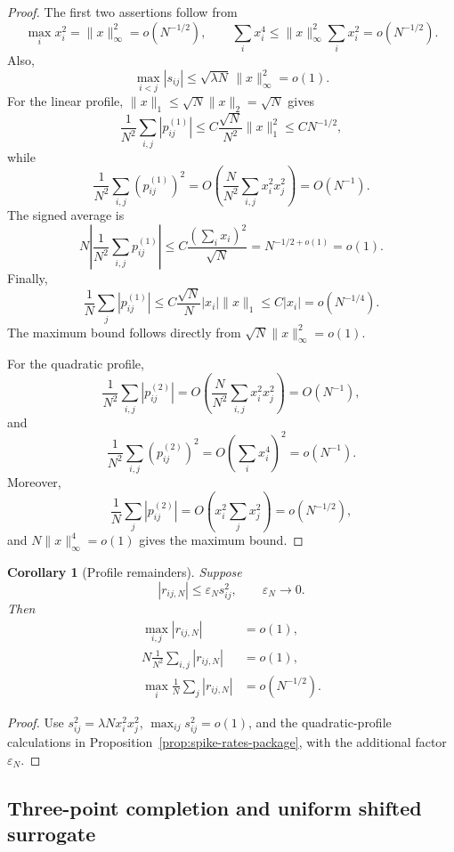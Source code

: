 \documentclass[11pt]{article}
\newtheorem{corollary}[theorem]{Corollary}
\theoremstyle{definition}
\theoremstyle{remark}
\newcommand{\norm}[1]{\lVert #1\rVert}
\begin{document}
\begin{proof}
The first two assertions follow from
\[
 \max_i x_i^2=\norm{x}_\infty^2=o(N^{-1/2}),
 \qquad
 \sum_i x_i^4
 \le\norm{x}_\infty^2\sum_i x_i^2=o(N^{-1/2}).
\]
Also,
\[
 \max_{i<j}|s_{ij}|
 \le\sqrt{\lambda N}\,\norm{x}_\infty^2=o(1).
\]
For the linear profile, \(\norm{x}_1\le\sqrt N\norm{x}_2=\sqrt N\)
gives
\[
 \frac1{N^2}\sum_{i,j}|p_{ij}^{(1)}|
 \le C\frac{\sqrt N}{N^2}\norm{x}_1^2
 \le CN^{-1/2},
\]
while
\[
 \frac1{N^2}\sum_{i,j}(p_{ij}^{(1)})^2
 =O\left(\frac{N}{N^2}\sum_{i,j}x_i^2x_j^2\right)
 =O(N^{-1}).
\]
The signed average is
\[
 N\left|\frac1{N^2}\sum_{i,j}p_{ij}^{(1)}\right|
 \le C\frac{(\sum_i x_i)^2}{\sqrt N}
 =N^{-1/2+o(1)}=o(1).
\]
Finally,
\[
 \frac1N\sum_j|p_{ij}^{(1)}|
 \le C\frac{\sqrt N}{N}|x_i|\norm{x}_1
 \le C|x_i|=o(N^{-1/4}).
\]
The maximum bound follows directly from
\(\sqrt N\norm{x}_\infty^2=o(1)\).

For the quadratic profile,
\[
 \frac1{N^2}\sum_{i,j}|p_{ij}^{(2)}|
 =O\left(\frac{N}{N^2}
 \sum_{i,j}x_i^2x_j^2\right)=O(N^{-1}),
\]
and
\[
 \frac1{N^2}\sum_{i,j}(p_{ij}^{(2)})^2
 =O\left(\sum_i x_i^4\right)^2=o(N^{-1}).
\]
Moreover,
\[
 \frac1N\sum_j|p_{ij}^{(2)}|
 =O\left(x_i^2\sum_jx_j^2\right)
 =o(N^{-1/2}),
\]
and \(N\norm{x}_\infty^4=o(1)\) gives the maximum bound.
\end{proof}

\begin{corollary}[Profile remainders]
\label{cor:profile-remainder-package}
Suppose
\begin{equation}\label{eq:profile-rem-package}
 |r_{ij,N}|\le\varepsilon_Ns_{ij}^2,
 \qquad \varepsilon_N\to0.
\end{equation}
Then
\begin{align}
 \max_{i,j}|r_{ij,N}|&=o(1),\\
 N\frac1{N^2}\sum_{i,j}|r_{ij,N}|&=o(1),\\
 \max_i\frac1N\sum_j|r_{ij,N}|&=o(N^{-1/2}).
\end{align}
\end{corollary}

\begin{proof}
Use \(s_{ij}^2=\lambda N x_i^2x_j^2\),
\(\max_{ij}s_{ij}^2=o(1)\), and the quadratic-profile calculations in
Proposition~\ref{prop:spike-rates-package}, with the additional factor
\(\varepsilon_N\).
\end{proof}

\subsection{Three-point completion and uniform shifted surrogate}
\label{sec:R2-package}
\end{document}

